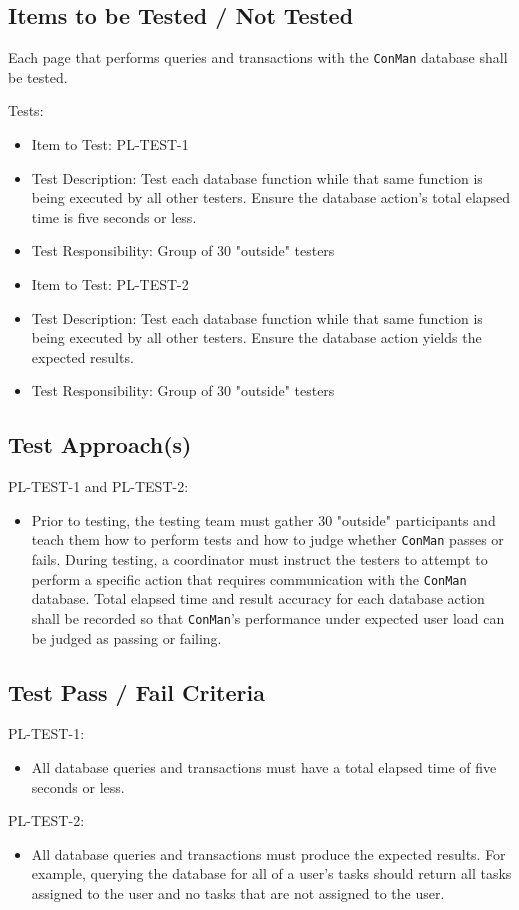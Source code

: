 \documentclass{article}
\begin{document}
\subsection{Items to be Tested / Not Tested}
Each page that performs queries and transactions with the \texttt{ConMan} 
database shall be tested.

Tests:
\begin{itemize}
\item Item to Test: PL-TEST-1
\item Test Description: Test each database function while that same function is being 
executed by all other testers. Ensure the database action's total elapsed time is 
five seconds or less. 
\item Test Responsibility: Group of 30 "outside" testers
\end{itemize}
\begin{itemize}
\item Item to Test: PL-TEST-2
\item Test Description: Test each database function while that same function is being 
executed by all other testers. Ensure the database action yields the expected results. 
\item Test Responsibility: Group of 30 "outside" testers
\end{itemize}

\subsection{Test Approach(s)}
PL-TEST-1 and PL-TEST-2:
\begin{itemize}
\item Prior to testing, the testing team must gather 30 "outside" participants 
and teach them how to perform tests and how to judge whether \texttt{ConMan} passes 
or fails. During testing, a coordinator must instruct the testers to attempt to 
perform a specific action that requires communication with the \texttt{ConMan} database. 
Total elapsed time and result accuracy for each database action shall be recorded so 
that \texttt{ConMan}'s performance under expected user load can be judged as passing 
or failing.
\end{itemize}

\subsection{Test Pass / Fail Criteria}
PL-TEST-1:
\begin{itemize}
\item All database queries and transactions must have a total elapsed time of five 
seconds or less.
\end{itemize}
PL-TEST-2:
\begin{itemize}
\item All database queries and transactions must produce the expected results. For example, 
querying the database for all of a user's tasks should return all tasks assigned to 
the user and no tasks that are not assigned to the user.
\end{itemize}
\end{document}
